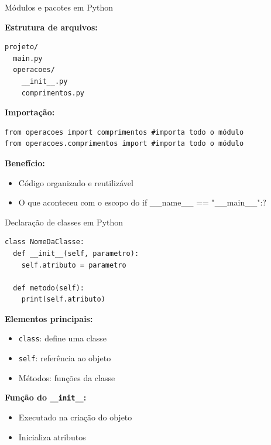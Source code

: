\documentclass{beamer}
\begin{document}
\begin{frame}[fragile]{Módulos e pacotes em Python}
  
  \textbf{Estrutura de arquivos:}
  
  \begin{verbatim}
projeto/
  main.py
  operacoes/
    __init__.py
    comprimentos.py
  \end{verbatim}
  
  \vspace{0.3cm}
  
  \textbf{Importação:}
  
  \begin{verbatim}
from operacoes import comprimentos #importa todo o módulo
from operacoes.comprimentos import #importa todo o módulo
  \end{verbatim}
  
  \vspace{0.2cm}
  
  \textbf{Benefício:}
  \begin{itemize}
    \item Código organizado e reutilizável
    \item O que aconteceu com o escopo do if \_\_name\_\_ == "\_\_main\_\_":?
  \end{itemize}
  
\end{frame}

\begin{frame}[fragile]{Declaração de classes em Python}
  
  \begin{verbatim}
class NomeDaClasse:
  def __init__(self, parametro):
    self.atributo = parametro
    
  def metodo(self):
    print(self.atributo)
  \end{verbatim}
  
  \vspace{0.3cm}
  
  \textbf{Elementos principais:}
  \begin{itemize}
    \item \texttt{class}: define uma classe
    \item \texttt{self}: referência ao objeto
    \item Métodos: funções da classe
  \end{itemize}
  \textbf{Função do \texttt{\_\_init\_\_}:}
  \begin{itemize}
    \item Executado na criação do objeto
    \item Inicializa atributos
  \end{itemize}
\end{frame}
\end{document}
